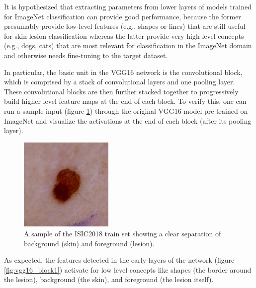 It is hypothesized that extracting parameters from lower layers of models trained for ImageNet classification can provide good performance, because the former presumably provide low-level features (e.g., shapes or lines) that are still useful for skin lesion classification whereas the latter provide very high-level concepts (e.g., dogs, cats) that are most relevant for classification in the ImageNet domain and otherwise needs fine-tuning to the target dataset.

In particular, the basic unit in the VGG16 network is the convolutional block, which is comprised by a stack of convolutional layers and one pooling layer. These convolutional blocks are then further stacked together to progressively build higher level feature maps at the end of each block. To verify this, one can run a sample input (figure \ref{fig:sample_input}) through the original VGG16 model pre-trained on ImageNet and visualize the activations at the end of each block (after its pooling layer).

\begin{figure}
    \centering
    \includegraphics[width=0.4\textwidth]{figs/sample_input.jpg}
    \caption{A sample of the ISIC2018 train set showing a clear separation of background (skin) and foreground (lesion).}
    \label{fig:sample_input}
\end{figure}

As expected, the features detected in the early layers of the network (figure \ref{fig:vgg16_block1}) activate for low level concepts like shapes (the border around the lesion), background (the skin), and foreground (the lesion itself).

